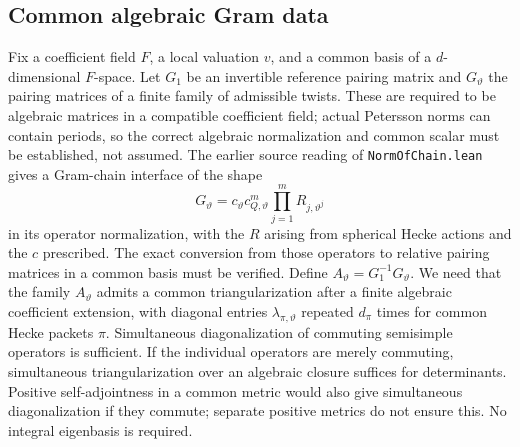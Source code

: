 \documentclass[11pt,a4paper]{article}
\begin{document}
\subsection{Common algebraic Gram data}
Fix a coefficient field $F$, a local valuation $v$, and a common basis of a $d$-dimensional $F$-space. Let $G_1$ be an invertible reference pairing matrix and $G_\vartheta$ the pairing matrices of a finite family of admissible twists. These are required to be algebraic matrices in a compatible coefficient field; actual Petersson norms can contain periods, so the correct algebraic normalization and common scalar must be established, not assumed. The earlier source reading of \texttt{NormOfChain.lean} gives a Gram-chain interface of the shape
\begin{equation}\label{eq:chain}
G_\vartheta=c_\vartheta c_{Q,\vartheta}^{m}\prod_{j=1}^m R_{j,\vartheta^j}
\end{equation}
in its operator normalization, with the $R$ arising from spherical Hecke actions and the $c$ prescribed. The exact conversion from those operators to relative pairing matrices in a common basis must be verified. Define $A_\vartheta=G_1^{-1}G_\vartheta$. We need that the family $A_\vartheta$ admits a common triangularization after a finite algebraic coefficient extension, with diagonal entries $\lambda_{\pi,\vartheta}$ repeated $d_\pi$ times for common Hecke packets $\pi$. Simultaneous diagonalization of commuting semisimple operators is sufficient. If the individual operators are merely commuting, simultaneous triangularization over an algebraic closure suffices for determinants. Positive self-adjointness in a common metric would also give simultaneous diagonalization if they commute; separate positive metrics do not ensure this. No integral eigenbasis is required.
\end{document}
